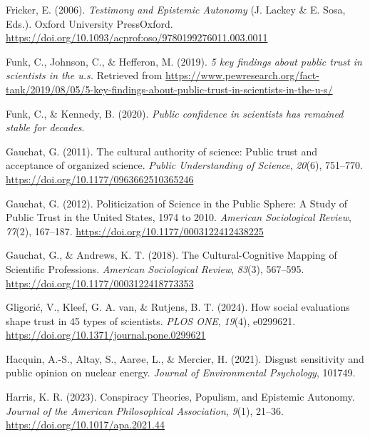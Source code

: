\documentclass[
  doc,floatsintext]{apa6}
\newlength{\cslhangindent}
\newenvironment{CSLReferences}[2] %
 {\begin{list}{}{%
  \setlength{\itemindent}{0pt}
  \setlength{\leftmargin}{0pt}
  \setlength{\parsep}{0pt}
  \ifodd #1
   \setlength{\leftmargin}{\cslhangindent}
   \setlength{\itemindent}{-1\cslhangindent}
  \fi
  \setlength{\itemsep}{#2\baselineskip}}}
 {\end{list}}
\begin{document}
\begin{CSLReferences}{1}{0}
Fricker, E. (2006). \emph{Testimony and Epistemic Autonomy} (J. Lackey \& E. Sosa, Eds.). Oxford University PressOxford. \url{https://doi.org/10.1093/acprof:oso/9780199276011.003.0011}

Funk, C., Johnson, C., \& Hefferon, M. (2019). \emph{5 key findings about public trust in scientists in the u.s.} Retrieved from \url{https://www.pewresearch.org/fact-tank/2019/08/05/5-key-findings-about-public-trust-in-scientists-in-the-u-s/}

Funk, C., \& Kennedy, B. (2020). \emph{Public confidence in scientists has remained stable for decades}.

Gauchat, G. (2011). The cultural authority of science: Public trust and acceptance of organized science. \emph{Public Understanding of Science}, \emph{20}(6), 751--770. \url{https://doi.org/10.1177/0963662510365246}

Gauchat, G. (2012). Politicization of Science in the Public Sphere: A Study of Public Trust in the United States, 1974 to 2010. \emph{American Sociological Review}, \emph{77}(2), 167--187. \url{https://doi.org/10.1177/0003122412438225}

Gauchat, G., \& Andrews, K. T. (2018). The Cultural-Cognitive Mapping of Scientific Professions. \emph{American Sociological Review}, \emph{83}(3), 567--595. \url{https://doi.org/10.1177/0003122418773353}

Gligorić, V., Kleef, G. A. van, \& Rutjens, B. T. (2024). How social evaluations shape trust in 45 types of scientists. \emph{PLOS ONE}, \emph{19}(4), e0299621. \url{https://doi.org/10.1371/journal.pone.0299621}

Hacquin, A.-S., Altay, S., Aarøe, L., \& Mercier, H. (2021). Disgust sensitivity and public opinion on nuclear energy. \emph{Journal of Environmental Psychology}, 101749.

Harris, K. R. (2023). Conspiracy Theories, Populism, and Epistemic Autonomy. \emph{Journal of the American Philosophical Association}, \emph{9}(1), 21--36. \url{https://doi.org/10.1017/apa.2021.44}


\end{CSLReferences}
\end{document}

